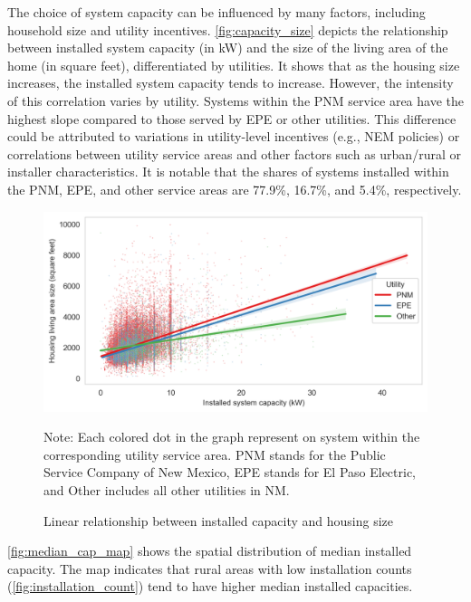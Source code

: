 \documentclass[12pt,twoside,letterpaper]{article}
\begin{document}
The choice of system capacity can be influenced by many factors, including household size and utility incentives. \autoref{fig:capacity_size} depicts the relationship between installed system capacity (in kW) and the size of the living area of the home (in square feet), differentiated by utilities. It shows that as the housing size increases, the installed system capacity tends to increase. However, the intensity of this correlation varies by utility. Systems within the PNM service area have the highest slope compared to those served by EPE or other utilities. This difference could be attributed to variations in utility-level incentives (e.g., NEM policies) or correlations between utility service areas and other factors such as urban/rural or installer characteristics. It is notable that the shares of systems installed within the PNM, EPE, and other service areas are 77.9\%, 16.7\%, and 5.4\%, respectively.
 
\begin{figure}[!ht]
    \centering
\includegraphics[width=1\textwidth]{figures/capacity_house_size.png}
    \caption{Linear relationship between installed capacity and housing size}
    \label{fig:capacity_size}
        \begin{flushleft}
        \footnotesize Note: Each colored dot in the graph represent on system within the corresponding utility service area. PNM stands for the Public Service Company of New Mexico, EPE stands for El Paso Electric, and Other includes all other utilities in NM.
    \end{flushleft}
\end{figure}

\autoref{fig:median_cap_map} shows the spatial distribution of median installed capacity. The map indicates that rural areas with low installation counts (\autoref{fig:installation_count}) tend to have higher median installed capacities.
\end{document}
